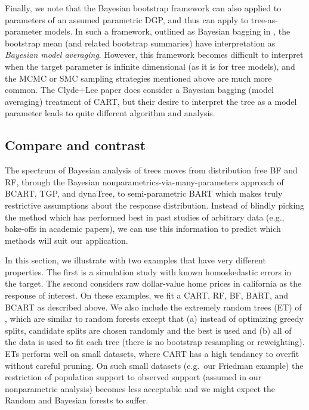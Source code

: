 \documentclass[12pt]{article}
\begin{document}
Finally, we note that the Bayesian bootstrap framework can also applied
to parameters of an assumed parametric DGP, and thus can apply to
tree-as-parameter models. In such a framework, outlined as Bayesian
bagging in \cite{clyde_bagging_2001}, the bootstrap mean (and related
bootstrap summaries) have interpretation as \emph{Bayesian model
averaging}. However, this framework becomes difficult to interpret when
the target parameter is infinite dimensional (as it is for tree models),
and the MCMC or SMC sampling strategies mentioned above are much more
common. The Clyde+Lee paper does consider a Bayesian bagging (model
averaging) treatment of CART, but their desire to interpret the tree as
a model parameter leads to quite different algorithm and analysis.

    \subsection{Compare and contrast}\label{compare-and-contrast}

The spectrum of Bayesian analysis of trees moves from distribution free
BF and RF, through the Bayesian nonparametrics-via-many-parameters
approach of BCART, TGP, and dynaTree, to semi-parametric BART which
makes truly restrictive assumptions about the response distribution.
Instead of blindly picking the method which has performed best in past
studies of arbitrary data (e.g., bake-offs in academic papers), we can
use this information to predict which methods will suit our application.

In this section, we illustrate with two examples that have very
different properties. The first is a simulation study with known
homoskedastic errors in the target. The second considers raw
dollar-value home prices in california as the response of interest. On
these examples, we fit a CART, RF, BF, BART, and BCART as described
above. We also include the extremely random trees (ET) of
\cite{geurts_extremely_2006}, which are similar to random forests except
that (a) instead of optimizing greedy splits, candidate splits are
chosen randomly and the best is used and (b) all of the data is used to
fit each tree (there is no bootstrap resampling or reweighting). ETs
perform well on small datasets, where CART has a high tendancy to
overfit without careful pruning. On such small datasets (e.g.~our
Friedman example) the restriction of population support to observed
support (assumed in our nonparametric analysis) becomes less acceptable
and we might expect the Random and Bayesian forests to suffer.
\end{document}
